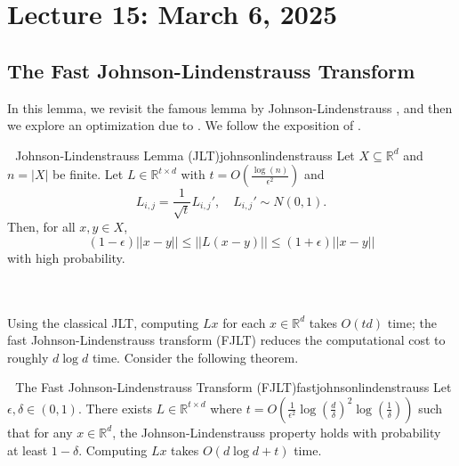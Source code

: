 \pagebreak

\section{Lecture 15: March 6, 2025}

    \subsection{The Fast Johnson-Lindenstrauss Transform}

        In this lemma, we revisit the famous lemma by Johnson-Lindenstrauss \cite{johnson1984extensions}, and then we explore an optimization due to \cite{ailon2009johnson}. We follow the exposition of \cite{harvey2014fjltlecture}.
        \begin{theorem}{\Stop\,\,\cite{johnson1984extensions} Johnson-Lindenstrauss Lemma (JLT)}{johnsonlindenstrauss}
            Let \(X\subseteq \mathbb{R}^d\) and \(n=|X|\) be finite. Let \(L\in \mathbb{R}^{t\times d}\) with \(t=O\left(\frac{\log(n)}{\epsilon^2}\right)\) and
            \begin{equation*}
                L_{i,j}=\frac{1}{\sqrt{t}}L_{i,j}', \quad L_{i,j}'\sim N(0,1).
            \end{equation*}
            Then, for all \(x,y\in X\),
            \begin{equation*}
                (1-\epsilon)||x-y||\leq||L(x-y)||\leq (1+\epsilon)||x-y||
            \end{equation*}
            with high probability.
        \end{theorem}
        \vphantom
        \\
        \\
        Using the classical JLT, computing \(Lx\) for each \(x\in\mathbb{R}^d\) takes \(O(td)\) time; the fast Johnson-Lindenstrauss transform (FJLT) reduces the computational cost to roughly \(d\log d\) time. Consider the following theorem.
        \begin{theorem}{\Stop\,\,\cite{ailon2009johnson} The Fast Johnson-Lindenstrauss Transform (FJLT)}{fastjohnsonlindenstrauss}
            Let \(\epsilon,\delta\in(0,1)\). There exists \(L\in\mathbb{R}^{t\times d}\) where \(t=O\left(\frac{1}{\epsilon^2}\log\left(\frac{d}{\delta}\right)^2\log\left(\frac{1}{\delta}\right)\right)\) such that for any \(x\in\mathbb{R}^d\), the Johnson-Lindenstrauss property holds with probability at least \(1-\delta\). Computing \(Lx\) takes \(O(d\log d+t)\) time.
        \end{theorem}
